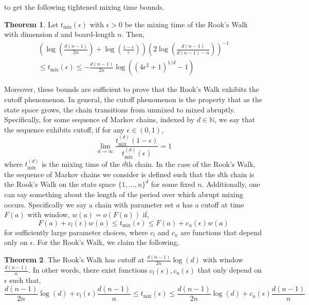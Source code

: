 \documentclass{article}
\theoremstyle{definition}
\theoremstyle{definition}
\newtheorem{theorem}{Theorem}
\theoremstyle{definition}
\theoremstyle{definition}
\theoremstyle{named}
\begin{document}
   to get the following tightened mixing time bounds.
      \begin{theorem}
         \label{main1}
      Let $t_\text{mix}(\epsilon)$ with $\epsilon >0$ be the mixing time of the Rook's Walk with dimension $d$ and board-length $n$. Then,
      \begin{multline*}
       \left(\log \left(\frac{d(n-1)}{2n}\right) + \log\left(\frac{1-\epsilon}{\epsilon}\right)\right)\left(2\log\left(\frac{d(n-1)}{d(n-1)-n}\right)\right)^{-1} \\
        \leq t_\text{mix}(\epsilon)  \leq-\frac{d(n-1)}{2n}\log\left((4\epsilon^2+1)^{1/d}-1\right) 
      \end{multline*}
   \end{theorem}
   \noindent Moreover, these bounds are sufficient to prove that the Rook's Walk exhibits the cutoff phenomenon. In general, the cutoff phenomenon is the property that as the state space grows, the chain transitions from unmixed to mixed abruptly. Specifically, for some sequence of Markov chains, indexed by $d\in \mathbb{N}$, we say that the sequence exhibits cutoff, if for any $\epsilon\in(0,1)$,
      \[\lim_{d\to \infty } \frac{t^{(d)}_\text{mix}(1-\epsilon)}{t^{(d)}_\text{mix}(\epsilon)}=1\]
   where $t_\text{mix}^{(d)}$ is the mixing time of the $d$th chain. In the case of the Rook's Walk, the sequence of Markov chains we consider is defined such that the $d$th chain is the Rook's Walk on the state space $\{1,\dots,n\}^d$ for some fixed $n$. Additionally, one can say something about the length of the period over which abrupt mixing occurs. Specifically we say a chain with parameter set $a$ has a cutoff at time $F(a)$ with window, $w(a)=o(F(a))$ if,
   \[F(a) + c_l(\epsilon) w(a) \leq t_\text{mix}(\epsilon) \leq F(a) + c_u(\epsilon) w(a)\]
   for sufficiently large parameter choices, where $c_l$ and $c_u$ are functions that depend only on $\epsilon$. For the Rook's Walk, we claim the following,
\begin{theorem}
         \label{main2}
   The Rook's Walk has cutoff at $\frac{d(n-1)}{2n}\log(d)$ with window $\frac{d(n-1)}{n}$. In other words, there exist functions $c_l(\epsilon), c_u(\epsilon)$ that only depend on $\epsilon$ such that,
   \[\frac{d(n-1)}{2n}\log(d) + c_l(\epsilon)\frac{d(n-1)}{n} \leq t_\text{mix}(\epsilon) \leq \frac{d(n-1)}{2n}\log(d) + c_u(\epsilon)\frac{d(n-1)}{n}\]
\end{theorem}
\end{document}
